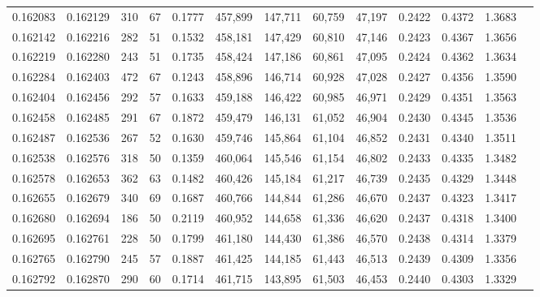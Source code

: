 \begin{tabular}{rrrrrrrrrrrrr}
0.162083 & 0.162129 &   310 &  67 &                                     0.1777 & 457,899 & 147,711 &  60,759 &  47,197 & 0.2422 & 0.4372 & 1.3683 \\
0.162142 & 0.162216 &   282 &  51 &                                     0.1532 & 458,181 & 147,429 &  60,810 &  47,146 & 0.2423 & 0.4367 & 1.3656 \\
0.162219 & 0.162280 &   243 &  51 &                                     0.1735 & 458,424 & 147,186 &  60,861 &  47,095 & 0.2424 & 0.4362 & 1.3634 \\
0.162284 & 0.162403 &   472 &  67 &                                     0.1243 & 458,896 & 146,714 &  60,928 &  47,028 & 0.2427 & 0.4356 & 1.3590 \\
0.162404 & 0.162456 &   292 &  57 &                                     0.1633 & 459,188 & 146,422 &  60,985 &  46,971 & 0.2429 & 0.4351 & 1.3563 \\
0.162458 & 0.162485 &   291 &  67 &                                     0.1872 & 459,479 & 146,131 &  61,052 &  46,904 & 0.2430 & 0.4345 & 1.3536 \\
0.162487 & 0.162536 &   267 &  52 &                                     0.1630 & 459,746 & 145,864 &  61,104 &  46,852 & 0.2431 & 0.4340 & 1.3511 \\
0.162538 & 0.162576 &   318 &  50 &                                     0.1359 & 460,064 & 145,546 &  61,154 &  46,802 & 0.2433 & 0.4335 & 1.3482 \\
0.162578 & 0.162653 &   362 &  63 &                                     0.1482 & 460,426 & 145,184 &  61,217 &  46,739 & 0.2435 & 0.4329 & 1.3448 \\
0.162655 & 0.162679 &   340 &  69 &                                     0.1687 & 460,766 & 144,844 &  61,286 &  46,670 & 0.2437 & 0.4323 & 1.3417 \\
0.162680 & 0.162694 &   186 &  50 &                                     0.2119 & 460,952 & 144,658 &  61,336 &  46,620 & 0.2437 & 0.4318 & 1.3400 \\
0.162695 & 0.162761 &   228 &  50 &                                     0.1799 & 461,180 & 144,430 &  61,386 &  46,570 & 0.2438 & 0.4314 & 1.3379 \\
0.162765 & 0.162790 &   245 &  57 &                                     0.1887 & 461,425 & 144,185 &  61,443 &  46,513 & 0.2439 & 0.4309 & 1.3356 \\
0.162792 & 0.162870 &   290 &  60 &                                     0.1714 & 461,715 & 143,895 &  61,503 &  46,453 & 0.2440 & 0.4303 & 1.3329 \\

\end{tabular}
